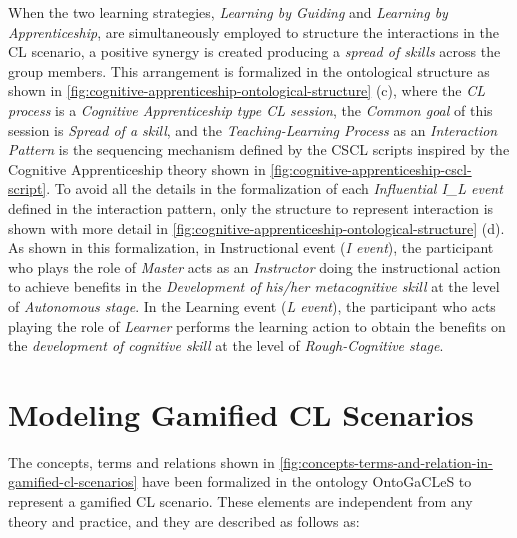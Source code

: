 When the two learning strategies, \emph{Learning by Guiding} and \emph{Learning by Apprenticeship}, are simultaneously employed to structure the interactions in the CL scenario, a positive synergy is created producing a \emph{spread of skills} across the group members. This arrangement is formalized in the ontological structure as shown in \autoref{fig:cognitive-apprenticeship-ontological-structure} (c), where the \emph{CL process} is a \emph{Cognitive Apprenticeship type CL session}, the \emph{Common goal} of this session is \emph{Spread of a skill}, and the \emph{Teaching-Learning Process} as an \emph{Interaction Pattern} is the sequencing mechanism defined by the CSCL scripts inspired by the Cognitive Apprenticeship theory shown in \autoref{fig:cognitive-apprenticeship-cscl-script}. To avoid all the details in the formalization of each \emph{Influential I\_L event} defined in the interaction pattern, only the structure to represent interaction  is shown with more detail in \autoref{fig:cognitive-apprenticeship-ontological-structure} (d). As shown in this formalization, in Instructional event  (\emph{I event}), the participant who plays the role of \emph{Master} acts as an \emph{Instructor} doing the instructional action  to achieve benefits in the \emph{Development of his/her metacognitive skill} at the level of \emph{Autonomous stage}. In the Learning event  (\emph{L event}), the participant who acts playing the role of \emph{Learner} performs the learning action  to obtain the benefits on the \emph{development of cognitive skill} at the level of \emph{Rough-Cognitive stage}.


\section{Modeling Gamified CL Scenarios}
\label{sec:modeling-gamified-cl-scenarios}

The concepts, terms and relations shown in \autoref{fig:concepts-terms-and-relation-in-gamified-cl-scenarios} have been formalized in the ontology OntoGaCLeS to represent a gamified CL scenario. These elements are independent from any theory and practice, and they are described as follows as:

